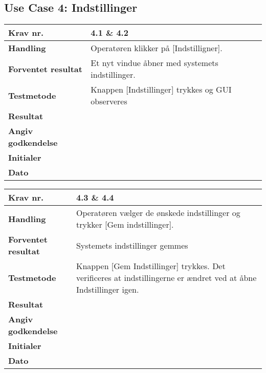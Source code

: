  \subsection{Use Case 4: Indstillinger}

	\begin{center}
		\begin{longtable}{ | m{4cm}| m{8.5cm}|} 
			\hline
			\textbf{Krav nr.} & 4.1 \& 4.2  \\ 
			\hline
			\textbf{Handling} & Operatøren klikker på [Indstilligner].  \\
			\hline
			\textbf{Forventet resultat} & Et nyt vindue åbner med systemets indstillinger. \\
			\hline
			\textbf{Testmetode}  & Knappen [Indstillinger] trykkes og GUI observeres  \\
			\hline
			\textbf{Resultat}  &    \\
			\hline
			\textbf{Angiv godkendelse} &     \\
			\hline
			\textbf{Initialer} &     \\
			\hline
			\textbf{Dato} &    \\
			\hline
		\end{longtable}
	\end{center}		
			
	\begin{center}
		\begin{longtable}{ | m{4cm}| m{8.5cm}|} 
			\hline
			\textbf{Krav nr.} & 4.3 \& 4.4 \\ 
			\hline
			\textbf{Handling} & Operatøren vælger de ønskede indstillinger og trykker [Gem indstillinger].  \\
			\hline
			\textbf{Forventet resultat} & Systemets indstillinger gemmes  \\
			\hline
			\textbf{Testmetode}  & Knappen [Gem Indstillinger] trykkes. Det verificeres at indstillingerne er ændret ved at åbne Indstillinger igen.  \\
			\hline
			\textbf{Resultat}  &    \\
			\hline
			\textbf{Angiv godkendelse} &     \\
			\hline
			\textbf{Initialer} &     \\
			\hline
			\textbf{Dato} &    \\
			\hline
		\end{longtable}
	\end{center}

\newpage

